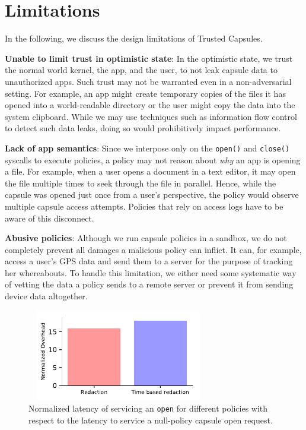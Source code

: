 \chapter{Limitations}
\label{sec:limitations}

In the following, we discuss the design limitations of Trusted Capsules.

{\bf Unable to limit trust in optimistic state}: In the optimistic state, we
trust the normal world kernel, the app, and the user, to not leak capsule data
to unauthorized apps. Such trust may not be warranted even in a non-adversarial
setting. For example, an app might create temporary copies of the files it has
opened into a world-readable directory or the user might copy the data into the
system clipboard. While we may use techniques such as information flow control
to detect such data leaks, doing so would prohibitively impact performance.

{\bf Lack of app semantics}: Since we interpose only on the {\tt open()} and
{\tt close()} syscalls to execute policies, a policy may not reason about {\em
  why} an app is opening a file. For example, when a user opens a document in a
text editor, it may open the file multiple times to seek through the file in
parallel. Hence, while the capsule was opened just once from a user's
perspective, the policy would observe multiple capsule access attempts. Policies
that rely on access logs have to be aware of this disconnect.

{\bf Abusive policies}: Although we run capsule policies in a sandbox, we do not
completely prevent all damages a malicious policy can inflict. It can, for
example, access a user's GPS data and send them to a server for the purpose of
tracking her whereabouts. To handle this limitation, we either need some
systematic way of vetting the data a policy sends to a remote server or prevent
it from sending device data altogether.


\begin{figure}[t]
   \centering
   \includegraphics[width=8cm,height=4cm]{fig/policy_latencies.pdf}  
   \caption{Normalized latency of servicing an \texttt{open} for different policies with respect to the latency to service a null-policy capsule open request. }
   \label{fig:policy_latency}
 \end{figure}



